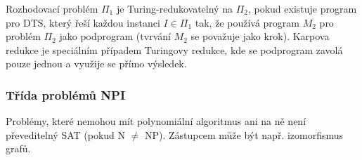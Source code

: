 Rozhodovací problém $\Pi_1$ je Turing-redukovatelný na $\Pi_2$, pokud existuje program pro DTS, který řeší každou instanci $I \in \Pi_1$ tak, že používá program $M_2$ pro problém $\Pi_2$ jako podprogram (tvrvání $M_2$ se považuje jako krok).
Karpova redukce je speciálním případem Turingovy redukce, kde se podprogram zavolá pouze jednou a využije se přímo výsledek.

\subsubsection{Třída problémů NPI}

Problémy, které nemohou mít polynomiální algoritmus ani na ně není převeditelný SAT (pokud N $\neq$ NP).
Zástupcem může být např. izomorfismus grafů.
